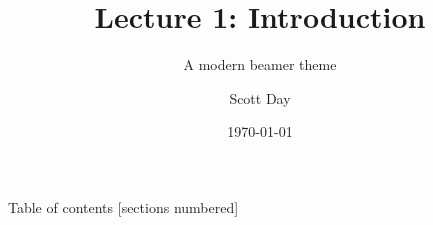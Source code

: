 \documentclass[9pt]{beamer}
\title{Lecture 1: Introduction}
\subtitle{A modern beamer theme}
\date{\today}
\author{Scott Day}
\institute{Curtin University}
\begin{document}


\maketitle

\begin{frame}{Table of contents}
  [sections numbered]
  \tableofcontents[hideallsubsections]
\end{frame}







\end{document}
